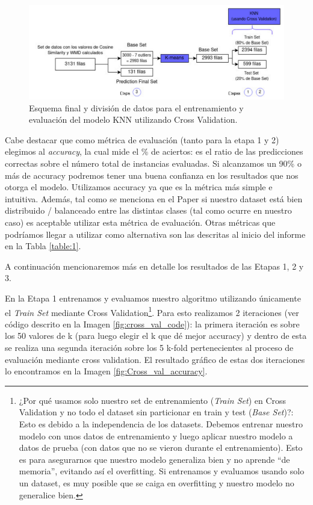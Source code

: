 \documentclass[12pt,a4paper]{article}
\begin{document}
\begin{sloppypar}
\begin{itemize}
\end{itemize}

\begin{figure}[H]   
\centering
\includegraphics[width=1\textwidth]{images/implementacion_5/esquema_2_cross_val.png}
\captionsetup{justification=centering,margin=1cm}
\caption{Esquema final y división de datos para el entrenamiento y evaluación del modelo KNN utilizando Cross Validation.}
\label{fig:esquema_2_cross_val}
\end{figure}

Cabe destacar que como métrica de evaluación (tanto para la etapa 1 y 2) elegimos al \textit{accuracy}, la cual mide el \% de aciertos: es el ratio de las predicciones correctas sobre el número total de instancias evaluadas. Si alcanzamos un 90\% o más de accuracy podremos tener una buena confianza en los resultados que nos otorga el modelo. Utilizamos accuracy ya que es la métrica más simple e intuitiva. Además, tal como se menciona en el Paper\cite{Implem_4} si nuestro dataset está bien distribuido / balanceado entre las distintas clases (tal como ocurre en nuestro caso) es aceptable utilizar esta métrica de evaluación. Otras métricas que podríamos llegar a utilizar como alternativa son las descritas al inicio del informe en la Tabla \ref{table:1}. 

\cleardoublepage

A continuación mencionaremos más en detalle los resultados de las Etapas 1, 2 y 3.

En la Etapa 1 entrenamos y evaluamos nuestro algoritmo utilizando únicamente el \textit{Train Set} mediante Cross Validation\footnote{¿Por qué usamos solo nuestro set de entrenamiento (\textit{Train Set}) en Cross Validation y no todo el dataset sin particionar en train y test (\textit{Base Set})?: Esto es debido a la independencia de los datasets. Debemos entrenar nuestro modelo con unos datos de entrenamiento y luego aplicar nuestro modelo a datos de prueba (con datos que no se vieron durante el entrenamiento). Esto es para asegurarnos que nuestro modelo generaliza bien y no aprende “de memoria”, evitando así el overfitting. Si entrenamos y evaluamos usando solo un dataset, es muy posible que se caiga en overfitting y nuestro modelo no generalice bien.}. Para esto realizamos 2 iteraciones (ver código descrito en la Imagen \ref{fig:cross_val_code}): la primera iteración es sobre los 50 valores de k (para luego elegir el k que dé mejor accuracy) y dentro de esta se realiza una segunda iteración sobre los 5 k-fold pertenecientes al proceso de evaluación mediante cross validation. El resultado gráfico de estas dos iteraciones lo encontramos en la Imagen \ref{fig:Cross_val_accuracy}.


\end{sloppypar}
\end{document}
